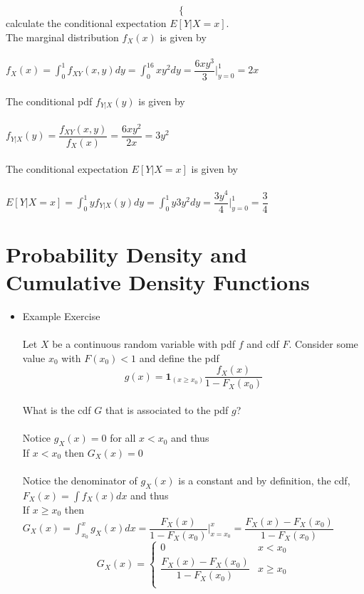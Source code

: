 \documentclass{article}
\begin{document}
\begin{itemize}
\begin{equation*}
\begin{cases}
            \end{cases}
        \end{equation*}
    calculate the conditional expectation $E[Y|X=x]$.\\
    The marginal distribution $f_X(x)$ is given by\\\\
    $f_X(x)=\int_0^1f_{XY}(x,y)dy=\int_0^16xy^2dy=\dfrac{6xy^3}{3}\bigg|_{y=0}^1=2x$\\\\
    The conditional pdf $f_{Y|X}(y)$ is given by\\\\
    $f_{Y|X}(y)=\dfrac{f_{XY}(x,y)}{f_X(x)}=\dfrac{6xy^2}{2x}=3y^2$\\\\
    The conditional expectation $E[Y|X=x]$ is given by\\\\
    $E[Y|X=x]=\int_0^1 yf_{Y|X}(y)dy=\int_0^1 y3y^2dy=\dfrac{3y^4}{4}\bigg|_{y=0}^1=\dfrac{3}{4}$
\end{itemize}
\pagebreak
\section{Probability Density and Cumulative Density Functions}
\begin{itemize}
    \item Example Exercise\\\\
    Let $X$ be a continuous random variable with pdf $f$ and cdf $F$.  Consider some value $x_0$ with $F(x_0)<1$ and define the pdf\\ $$g(x)=\textbf{1}_{(x\geq x_0)}\dfrac{f_X(x)}{1-F_X(x_0)}$$\\
    What is the cdf $G$ that is associated to the pdf $g$?\\\\
    Notice $g_X(x)=0$ for all $x<x_0$ and thus\\
    If $x<x_0$ then $G_X(x)=0$\\\\
    Notice the denominator of $g_X(x)$ is a constant and by definition, the cdf, $F_X(x)=\int f_X(x)dx$ and thus\\
    If $x\geq x_0$ then $G_X(x)=\int_{x_0}^xg_X(x)dx=\dfrac{F_X(x)}{1-F_X(x_0)}\bigg|_{x=x_0}^x=\dfrac{F_X(x)-F_X(x_0)}{1-F_X(x_0)}$
    \begin{equation*}
            G_X(x)=\begin{cases}
            0 & x<x_0\\
            \dfrac{F_X(x)-F_X(x_0)}{1-F_X(x_0)} & x\geq x_0\\
            \end{cases}
        \end{equation*}
\end{itemize}
\pagebreak
\end{document}
